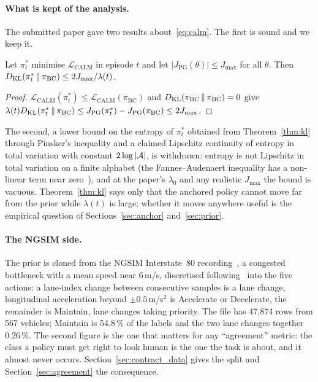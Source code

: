 \paragraph{What is kept of the analysis.}
The submitted paper gave two results about~\eqref{eq:calm}. The first is sound and we keep it.
\begin{theorem}[KL bound]
\label{thm:kl}
Let $\pi_t^{*}$ minimise $\mathcal{L}_{\mathrm{CALM}}$ in episode $t$ and let $|J_{\mathrm{PG}}(\theta)|\le J_{\max}$ for all $\theta$. Then $D_{\mathrm{KL}}(\pi_t^{*}\,\|\,\pi_{\mathrm{BC}})\le 2J_{\max}/\lambda(t)$.
\end{theorem}
\begin{proof}
$\mathcal{L}_{\mathrm{CALM}}(\pi_t^{*})\le\mathcal{L}_{\mathrm{CALM}}(\pi_{\mathrm{BC}})$ and $D_{\mathrm{KL}}(\pi_{\mathrm{BC}}\,\|\,\pi_{\mathrm{BC}})=0$ give $\lambda(t)D_{\mathrm{KL}}(\pi_t^{*}\,\|\,\pi_{\mathrm{BC}})\le J_{\mathrm{PG}}(\pi_t^{*})-J_{\mathrm{PG}}(\pi_{\mathrm{BC}})\le 2J_{\max}$.
\end{proof}
The second, a lower bound on the entropy of $\pi_t^{*}$ obtained from Theorem~\ref{thm:kl} through Pinsker's inequality and a claimed Lipschitz continuity of entropy in total variation with constant $2\log|\mathcal{A}|$, is withdrawn: entropy is not Lipschitz in total variation on a finite alphabet (the Fannes--Audenaert inequality has a non-linear term near zero~\cite{cover2006elements}), and at the paper's $\lambda_0$ and any realistic $J_{\max}$ the bound is vacuous. Theorem~\ref{thm:kl} says only that the anchored policy cannot move far from the prior while $\lambda(t)$ is large; whether it moves anywhere useful is the empirical question of Sections~\ref{sec:anchor} and~\ref{sec:prior}.

\paragraph{The NGSIM side.}
The prior is cloned from the NGSIM Interstate~80 recording~\cite{ngsim2006,colyar2007us}, a congested bottleneck with a mean speed near 6\,m/s, discretised following~\cite{thiemann2008estimating} into the five actions: a lane-index change between consecutive samples is a lane change, longitudinal acceleration beyond $\pm0.5$\,m/s$^2$ is Accelerate or Decelerate, the remainder is Maintain, lane changes taking priority. The file has 47{,}874 rows from 567 vehicles; Maintain is 54.8\,\% of the labels and the two lane changes together 0.26\,\%. The second figure is the one that matters for any ``agreement'' metric: the class a policy must get right to look human is the one the task is about, and it almost never occurs. Section~\ref{sec:contract_data} gives the split and Section~\ref{sec:agreement} the consequence.

